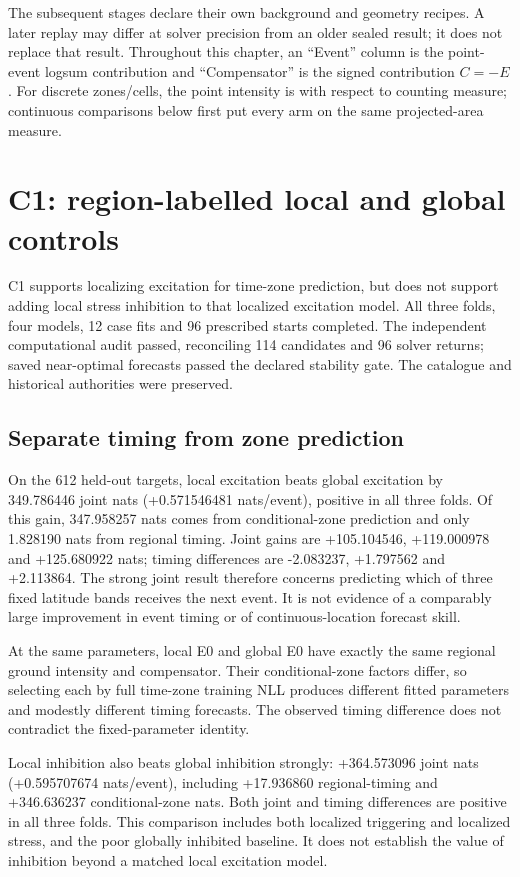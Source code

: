 The subsequent stages declare their own background and geometry recipes. A later replay may differ at solver precision from an older sealed result; it does not replace that result. Throughout this chapter, an ``Event'' column is the point-event logsum contribution and ``Compensator'' is the signed contribution $C=-E$. For discrete zones/cells, the point intensity is with respect to counting measure; continuous comparisons below first put every arm on the same projected-area measure.

\section{C1: region-labelled local and global controls}

C1 supports localizing excitation for time-zone prediction, but does not support adding local stress inhibition to that localized excitation model. All three folds, four models, 12 case fits and 96 prescribed starts completed. The independent computational audit passed, reconciling 114 candidates and 96 solver returns; saved near-optimal forecasts passed the declared stability gate. The catalogue and historical authorities were preserved.

\subsection{Separate timing from zone prediction}

On the 612 held-out targets, local excitation beats global excitation by 349.786446 joint nats (+0.571546481 nats/event), positive in all three folds. Of this gain, 347.958257 nats comes from conditional-zone prediction and only 1.828190 nats from regional timing. Joint gains are +105.104546, +119.000978 and +125.680922 nats; timing differences are -2.083237, +1.797562 and +2.113864. The strong joint result therefore concerns predicting which of three fixed latitude bands receives the next event. It is not evidence of a comparably large improvement in event timing or of continuous-location forecast skill.

At the same parameters, local E0 and global E0 have exactly the same regional ground intensity and compensator. Their conditional-zone factors differ, so selecting each by full time-zone training NLL produces different fitted parameters and modestly different timing forecasts. The observed timing difference does not contradict the fixed-parameter identity.

Local inhibition also beats global inhibition strongly: +364.573096 joint nats (+0.595707674 nats/event), including +17.936860 regional-timing and +346.636237 conditional-zone nats. Both joint and timing differences are positive in all three folds. This comparison includes both localized triggering and localized stress, and the poor globally inhibited baseline. It does not establish the value of inhibition beyond a matched local excitation model.

